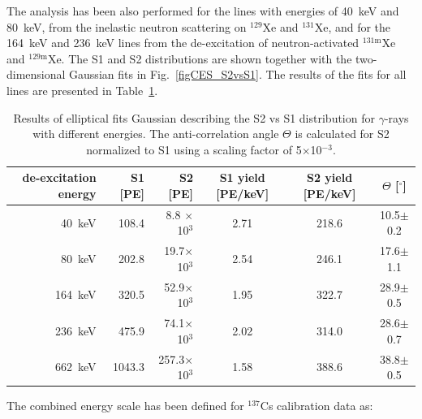 The analysis has been also performed for the lines with energies of 40~keV and 80~keV, from the inelastic neutron scattering on $^{129}$Xe and $^{131}$Xe, and for the 164~keV and 236~keV lines from the de-excitation of neutron-activated $^{131\mathrm{m}}$Xe and $^{129\mathrm{m}}$Xe. The S1 and S2 distributions are shown together with the two-dimensional Gaussian fits in Fig.~\ref{figCES_S2vsS1}. The results of the fits for all lines are presented in Table~\ref{tabCESresults}.

\begin{table}[!h]
\centering
\caption[Results of elliptical Gaussian fits describing the S2 vs S1 distribution for $\gamma$-rays with different energies]{Results of elliptical fits Gaussian describing the S2 vs S1 distribution for $\gamma$-rays with different energies. The anti-correlation angle $\Theta$ is calculated for S2 normalized to S1 using a scaling factor of 5$\times$10$^{-3}$.}
\label{tabCESresults}
\begin{tabular}{>{\footnotesize}r |>{\footnotesize} r |>{\footnotesize} r |>{\footnotesize} c |>{\footnotesize} c |>{\footnotesize} c}
\hline
de-excitation energy 	& S1	[PE]		& S2	[PE]					& S1 yield [PE/keV]		& S2 yield [PE/keV]		& $\Theta$ [$^{\circ}$] \\
\hline
40~keV			& 108.4 		& 8.8	$\times$10$^{3}$		& 2.71				& 218.6 				& 10.5$\pm$0.2 \\
80~keV			& 202.8 		& 19.7$\times$10$^{3}$		& 2.54				& 246.1 				& 17.6$\pm$1.1 \\
164~keV			& 320.5 		& 52.9$\times$10$^{3}$		& 1.95				& 322.7 				& 28.9$\pm$0.5 \\
236~keV			& 475.9 		& 74.1$\times$10$^{3}$		& 2.02				& 314.0 				& 28.6$\pm$0.7 \\
662~keV			& 1043.3 		& 257.3$\times$10$^{3}$		& 1.58				& 388.6 				& 38.8$\pm$0.5 \\
\hline
\end{tabular}
\end{table}

The combined energy scale has been defined for $^{137}$Cs calibration data as:

